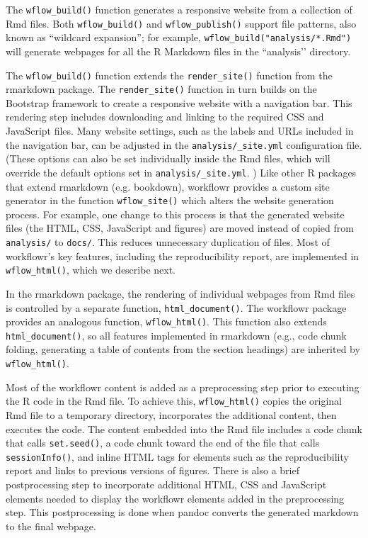 \documentclass[9pt,a4paper]{extarticle}
\begin{document}
The \texttt{wflow\_build()} function generates a responsive website from a
collection of Rmd files. Both \texttt{wflow\_build()} and \texttt{wflow\_publish()} support
file patterns, also known as “wildcard expansion”; for example,
\texttt{wflow\_build("analysis/*.Rmd")} will generate webpages for all
the R Markdown files in the ``analysis’’ directory.

The \texttt{wflow\_build()} function extends the \texttt{render\_site()} function from the
rmarkdown package. The \texttt{render\_site()} function in turn builds on the
Bootstrap framework to create a responsive website with a navigation
bar. This rendering step includes downloading and linking to the
required CSS and JavaScript files. Many website settings, such as the
labels and URLs included in the navigation bar, can be adjusted in the
\verb|analysis/_site.yml| configuration file. (These options can also be
set individually inside the Rmd files, which will override the default
options set in \texttt{analysis/\_site.yml}. ) Like other R packages
that extend rmarkdown (e.g. bookdown), workflowr provides a custom site
generator in the function \texttt{wflow\_site()} which alters the website
generation process. For example, one change to this process is that the
generated website files (the HTML, CSS, JavaScript and figures) are
moved instead of copied from \verb|analysis/| to \verb|docs/|. This
reduces unnecessary duplication of files. Most of workflowr’s key
features, including the reproducibility report, are implemented in
\texttt{wflow\_html()}, which we describe next.

In the rmarkdown package, the rendering of individual webpages from Rmd
files is controlled by a separate function, \texttt{html\_document()}. The
workflowr package provides an analogous function, \texttt{wflow\_html()}. This
function also extends \texttt{html\_document()}, so all features implemented in
rmarkdown (e.g., code chunk folding, generating a table of contents from
the section headings) are inherited by \texttt{wflow\_html()}.

Most of the workflowr content is added as a preprocessing step prior to
executing the R code in the Rmd file. To achieve this, \texttt{wflow\_html()}
copies the original Rmd file to a temporary directory, incorporates the
additional content, then executes the code. The content embedded into
the Rmd file includes a code chunk that calls \texttt{set.seed()}, a code chunk
toward the end of the file that calls \texttt{sessionInfo()}, and inline HTML
tags for elements such as the reproducibility report and links to
previous versions of figures. There is also a brief postprocessing step
to incorporate additional HTML, CSS and JavaScript elements needed to
display the workflowr elements added in the preprocessing step. This
postprocessing is done when pandoc converts the generated markdown to
the final webpage.
\end{document}
